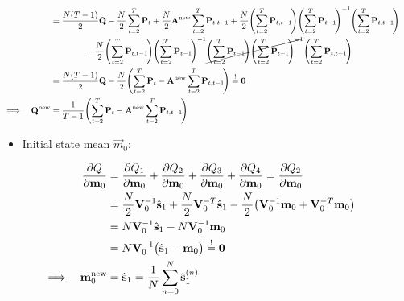 \begin{align}
		&&	&= \frac{N(T - 1)}{2} \mat{Q} - \frac{N}{2} \sum_{t = 2}^{T} \mat{P}_t + \frac{N}{2} \mat{A}^\new \sum_{t = 2}^{T} \mat{P}_{t, t - 1} + \frac{N}{2} \Bigg(\! \sum_{t = 2}^{T} \mat{P}_{t, t - 1} \!\Bigg) \Bigg(\! \sum_{t = 2}^{T} \mat{P}_{t - 1} \!\Bigg)^{-1} \Bigg(\! \sum_{t = 2}^{T} \mat{P}_{t, t - 1} \!\Bigg) & \nonumber \\
			&&	&\qquad\qquad - \frac{N}{2} \Bigg(\! \sum_{t = 2}^{T} \mat{P}_{t, t - 1} \!\Bigg) \Bigg(\! \sum_{t = 2}^{T} \mat{P}_{t - 1} \!\Bigg)^{-1} \cancel{\Bigg(\! \sum_{t = 2}^{T} \mat{P}_{t - 1} \!\Bigg) \Bigg(\! \sum_{t = 2}^{T} \mat{P}_{t - 1} \!\Bigg)^{-1}} \Bigg(\! \sum_{t = 2}^{T} \mat{P}_{t, t - 1} \!\Bigg) & \nonumber \\
		&&	&= \frac{N(T - 1)}{2} \mat{Q} - \frac{N}{2} \Bigg(\! \sum_{t = 2}^{T} \mat{P}_t - \mat{A}^\new \sum_{t = 2}^{T} \mat{P}_{t, t - 1} \!\Bigg) \overset{!}{=} \mat{0} & \nonumber \\
		\implies && \mat{Q}^\new &= \frac{1}{T - 1} \Bigg(\! \sum_{t = 2}^{T} \mat{P}_t - \mat{A}^\new \sum_{t = 2}^{T} \mat{P}_{t, t - 1} \!\Bigg) & \label{eq:stateNoiseCovariance}
	\end{align}

	\begin{itemize}
		\item Initial state mean \(\vec{m}_0\):
	\end{itemize}
	\begin{align}
		&&\pdv{Q}{\boldsymbol{\mathrm{m}}_0}
			&= \pdv{Q_1}{\boldsymbol{\mathrm{m}}_0} + \pdv{Q_2}{\boldsymbol{\mathrm{m}}_0} + \pdv{Q_3}{\boldsymbol{\mathrm{m}}_0} + \pdv{Q_4}{\boldsymbol{\mathrm{m}}_0} = \pdv{Q_2}{\boldsymbol{\mathrm{m}}_0} & \nonumber \\
		&&	&= \frac{N}{2} \boldsymbol{\mathrm{V}}_0^{-1} \hat{\boldsymbol{\mathrm{s}}}_1 + \frac{N}{2} \boldsymbol{\mathrm{V}}_0^{-T} \hat{\boldsymbol{\mathrm{s}}}_1 - \frac{N}{2} \big( \boldsymbol{\mathrm{V}}_0^{-1} \boldsymbol{\mathrm{m}}_0 + \boldsymbol{\mathrm{V}}_0^{-T} \boldsymbol{\mathrm{m}}_0 \big) & \nonumber \\
		&&	&= N \boldsymbol{\mathrm{V}}_0^{-1} \hat{\boldsymbol{\mathrm{s}}}_1 - N \boldsymbol{\mathrm{V}}_0^{-1} \boldsymbol{\mathrm{m}}_0 & \nonumber \\
		&&	&= N \boldsymbol{\mathrm{V}}_0^{-1} \big( \hat{\boldsymbol{\mathrm{s}}}_1 - \boldsymbol{\mathrm{m}}_0 \big) \overset{!}{=} \boldsymbol{\mathrm{0}} & \nonumber \\
		\implies && \boldsymbol{\mathrm{m}}_0^{\mathrm{new}} &= \hat{\boldsymbol{\mathrm{s}}}_1 = \frac{1}{N} \sum_{n = 0}^{N} \hat{\boldsymbol{\mathrm{s}}}_1^{(n)} & \label{eq:initialStateMean}
	\end{align}

